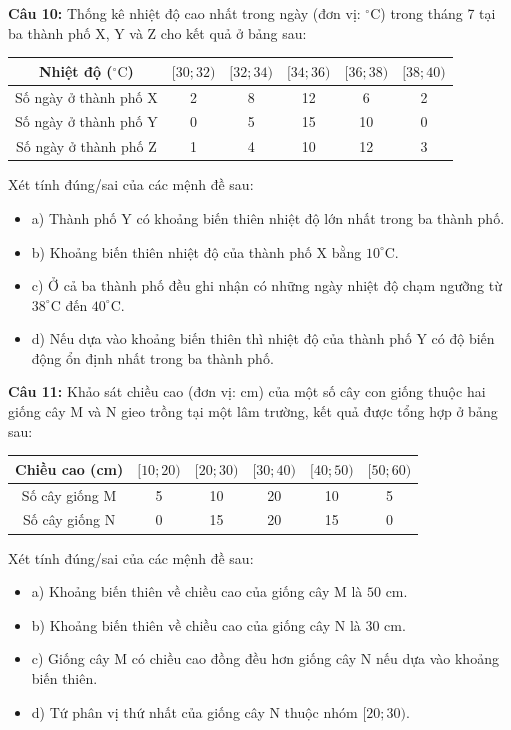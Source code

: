 \documentclass[12pt]{article}
\begin{document}
	\noindent \textbf{Câu 10:} Thống kê nhiệt độ cao nhất trong ngày (đơn vị: $^\circ\text{C}$) trong tháng 7 tại ba thành phố X, Y và Z cho kết quả ở bảng sau:
	\begin{center}
		\renewcommand{\arraystretch}{1.3}
		\begin{tabular}{|c|c|c|c|c|c|}
			\hline
			Nhiệt độ ($^\circ\text{C}$) & $[30; 32)$ & $[32; 34)$ & $[34; 36)$ & $[36; 38)$ & $[38; 40)$ \\
			\hline
			Số ngày ở thành phố X & 2 & 8 & 12 & 6 & 2 \\
			\hline
			Số ngày ở thành phố Y & 0 & 5 & 15 & 10 & 0 \\
			\hline
			Số ngày ở thành phố Z & 1 & 4 & 10 & 12 & 3 \\
			\hline
		\end{tabular}
	\end{center}
	Xét tính đúng/sai của các mệnh đề sau:
	\begin{itemize}[label=, leftmargin=*]
		\item  a) Thành phố Y có khoảng biến thiên nhiệt độ lớn nhất trong ba thành phố.
		\item  b) Khoảng biến thiên nhiệt độ của thành phố X bằng $10^\circ\text{C}$.
		\item  c) Ở cả ba thành phố đều ghi nhận có những ngày nhiệt độ chạm ngưỡng từ $38^\circ\text{C}$ đến $40^\circ\text{C}$.
		\item  d) Nếu dựa vào khoảng biến thiên thì nhiệt độ của thành phố Y có độ biến động ổn định nhất trong ba thành phố.
	\end{itemize}
	
	\noindent \textbf{Câu 11:} Khảo sát chiều cao (đơn vị: cm) của một số cây con giống thuộc hai giống cây M và N gieo trồng tại một lâm trường, kết quả được tổng hợp ở bảng sau:
	\begin{center}
		\renewcommand{\arraystretch}{1.3}
		\begin{tabular}{|c|c|c|c|c|c|}
			\hline
			Chiều cao (cm) & $[10; 20)$ & $[20; 30)$ & $[30; 40)$ & $[40; 50)$ & $[50; 60)$ \\
			\hline
			Số cây giống M & 5 & 10 & 20 & 10 & 5 \\
			\hline
			Số cây giống N & 0 & 15 & 20 & 15 & 0 \\
			\hline
		\end{tabular}
	\end{center}
	Xét tính đúng/sai của các mệnh đề sau:
	\begin{itemize}[label=, leftmargin=*]
		\item a) Khoảng biến thiên về chiều cao của giống cây M là $50\text{ cm}$.
		\item b) Khoảng biến thiên về chiều cao của giống cây N là $30\text{ cm}$.
		\item c) Giống cây M có chiều cao đồng đều hơn giống cây N nếu dựa vào khoảng biến thiên.
		\item d) Tứ phân vị thứ nhất của giống cây N thuộc nhóm $[20; 30)$.
	\end{itemize}
	
\end{document}
